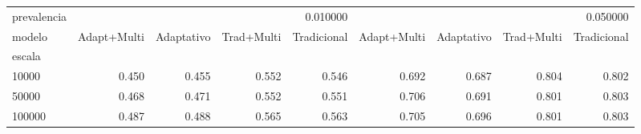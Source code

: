 \begin{tabular}{lrrrrrrrr}
\toprule
prevalencia & \multicolumn{4}{r}{0.010000} & \multicolumn{4}{r}{0.050000} \\
modelo & Adapt+Multi & Adaptativo & Trad+Multi & Tradicional & Adapt+Multi & Adaptativo & Trad+Multi & Tradicional \\
escala &  &  &  &  &  &  &  &  \\
\midrule
10000 & 0.450 & 0.455 & 0.552 & 0.546 & 0.692 & 0.687 & 0.804 & 0.802 \\
50000 & 0.468 & 0.471 & 0.552 & 0.551 & 0.706 & 0.691 & 0.801 & 0.803 \\
100000 & 0.487 & 0.488 & 0.565 & 0.563 & 0.705 & 0.696 & 0.801 & 0.803 \\
\bottomrule
\end{tabular}
